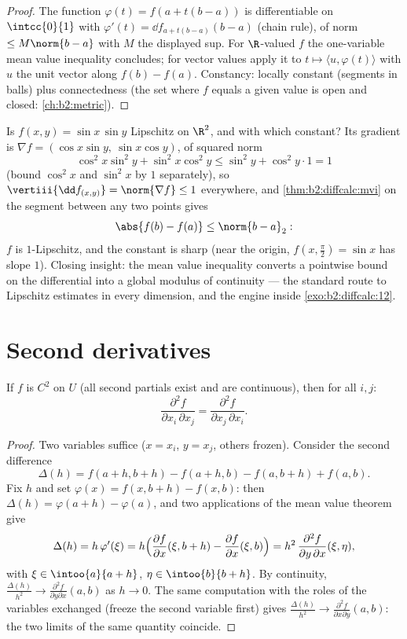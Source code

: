 \begin{proof}
The function $\varphi(t) = f(a + t(b-a))$ is differentiable on
$\intcc{0}{1}$ with $\varphi'(t) = \dd f_{a + t(b-a)}(b - a)$
(chain rule), of norm $\leq M\norm{b-a}$ with $M$ the displayed
sup. For $\R$-valued $f$ the one-variable mean value inequality
concludes; for vector values apply it to $t \mapsto \langle u,
\varphi(t)\rangle$ with $u$ the unit vector along $f(b) - f(a)$.
Constancy: locally constant (segments in balls) plus connectedness
(the set where $f$ equals a given value is open and closed:
\cref{ch:b2:metric}).
\end{proof}

\begin{example}\label{ex:b2:diffcalc:lipschitz}
Is $f(x, y) = \sin x\,\sin y$ Lipschitz on $\R^2$, and with
which constant? Its gradient is $\nabla f = (\cos x\sin y,\
\sin x\cos y)$, of squared norm
\[
\cos^2x\sin^2y + \sin^2x\cos^2y
\leq \sin^2 y + \cos^2y\cdot 1 = 1
\]
(bound $\cos^2x$ and $\sin^2x$ by $1$ separately), so
$\vertiii{\dd f_{(x,y)}} = \norm{\nabla f} \leq 1$ everywhere,
and \cref{thm:b2:diffcalc:mvi} on the segment between any two
points gives
\[
\abs{f(b) - f(a)} \leq \norm{b - a}_2 :
\]
$f$ is $1$-Lipschitz, and the constant is sharp (near the
origin, $f(x, \tfrac\pi2) = \sin x$ has slope $1$). Closing
insight: the mean value inequality converts a pointwise bound
on the differential into a global modulus of continuity ---
the standard route to Lipschitz estimates in every dimension,
and the engine inside \cref{exo:b2:diffcalc:12}.
\end{example}

\section{Second derivatives}

\begin{theorem}[Schwarz]\label{thm:b2:diffcalc:schwarz}
If $f$ is $C^2$ on $U$ (all second partials exist and are
continuous), then for all $i, j$:
\[
\frac{\partial^2 f}{\partial x_i\,\partial x_j}
= \frac{\partial^2 f}{\partial x_j\,\partial x_i} .
\]
\end{theorem}

\begin{proof}
Two variables suffice ($x = x_i$, $y = x_j$, others frozen).
Consider the second difference
\[
\Delta(h) = f(a + h, b + h) - f(a + h, b) - f(a, b + h) + f(a,b) .
\]
Fix $h$ and set $\varphi(x) = f(x, b+h) - f(x, b)$: then $\Delta(h)
= \varphi(a + h) - \varphi(a)$, and two applications of the mean
value theorem give
\[
\Delta(h) = h\,\varphi'(\xi)
= h\Bigl(\frac{\partial f}{\partial x}(\xi, b+h) -
\frac{\partial f}{\partial x}(\xi, b)\Bigr)
= h^2\,\frac{\partial^2 f}{\partial y\,\partial x}(\xi, \eta),
\]
with $\xi \in \intoo{a}{a+h}$, $\eta \in \intoo{b}{b+h}$. By
continuity, $\frac{\Delta(h)}{h^2} \to \frac{\partial^2 f}{\partial
y\partial x}(a, b)$ as $h \to 0$. The same computation with the
roles of the variables exchanged (freeze the second variable first)
gives $\frac{\Delta(h)}{h^2} \to \frac{\partial^2 f}{\partial x
\partial y}(a,b)$: the two limits of the same quantity coincide.
\end{proof}

